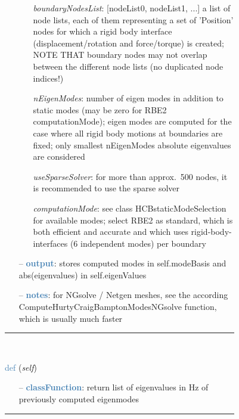 \begin{itemize}[leftmargin=1.4cm]
\begin{itemize}[leftmargin=0.5cm]
\begin{itemize}[leftmargin=1.4cm]
\begin{itemize}[leftmargin=1.4cm]
\begin{itemize}[leftmargin=0.5cm]
\begin{itemize}[leftmargin=0.7cm]
  \begin{itemize}[leftmargin=1.2cm]
\setlength{\itemindent}{-0.7cm}
    \item[] {\it boundaryNodesList}: [nodeList0, nodeList1, ...] a list of node lists, each of them representing a set of 'Position' nodes for which a rigid body interface (displacement/rotation and force/torque) is created; NOTE THAT boundary nodes may not overlap between the different node lists (no duplicated node indices!)
    \item[] {\it   nEigenModes}: number of eigen modes in addition to static modes (may be zero for RBE2 computationMode); eigen modes are computed for the case where all rigid body motions at boundaries are fixed; only smallest nEigenModes absolute eigenvalues are considered
    \item[] {\it   useSparseSolver}: for more than approx.~500 nodes, it is recommended to use the sparse solver
    \item[] {\it   computationMode}: see class HCBstaticModeSelection for available modes; select RBE2 as standard, which is both efficient and accurate and which uses rigid-body-interfaces (6 independent modes) per boundary
  \end{itemize}
  \item[--]  \textcolor{steelblue}{\bf output}: stores computed modes in self.modeBasis and abs(eigenvalues) in self.eigenValues  \item[--]  \textcolor{steelblue}{\bf notes}: for NGsolve / Netgen meshes, see the according ComputeHurtyCraigBamptonModesNGsolve function, which is usually much faster\vspace{12pt}\end{itemize}
%
\noindent\rule{8cm}{0.75pt}\vspace{1pt} \\ 
\begin{flushleft}
\noindent \textcolor{steelblue}{def {\bf {}}}\label{sec:FEM:FEMinterface:GetEigenFrequenciesHz}
({\it self})
\end{flushleft}
\setlength{\itemindent}{0.7cm}
\begin{itemize}[leftmargin=0.7cm]
  \item[--]  \textcolor{steelblue}{\bf classFunction}: return list of eigenvalues in Hz of previously computed eigenmodes\vspace{12pt}\end{itemize}
%
\noindent\rule{8cm}{0.75pt}\vspace{1pt} \\ 

\end{itemize}
\end{itemize}
\end{itemize}
\end{itemize}
\end{itemize}
